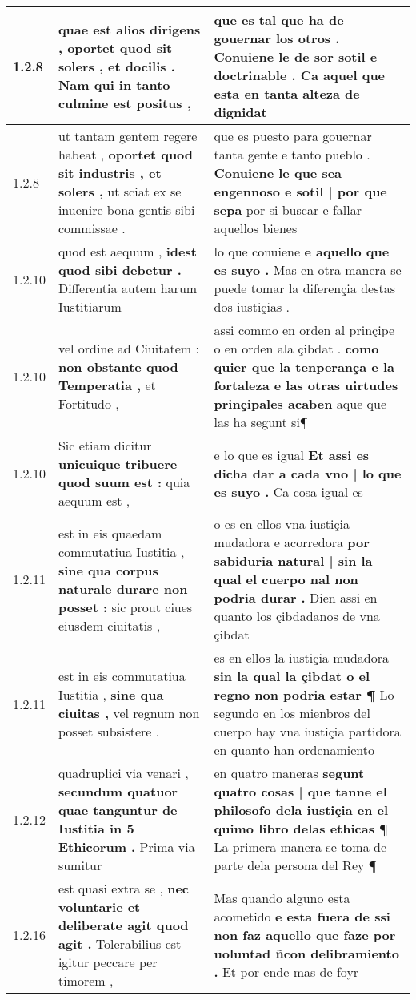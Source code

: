 \begin{tabular}{|p{1cm}|p{6.5cm}|p{6.5cm}|}
1.2.8 & quae est alios dirigens , \textbf{ oportet quod sit solers , et docilis . } Nam qui in tanto culmine est positus , & que es tal que ha de gouernar los otros . \textbf{ Conuiene le de sor sotil e doctrinable . } Ca aquel que esta en tanta alteza de dignidat \\\hline
1.2.8 & ut tantam gentem regere habeat , \textbf{ oportet quod sit industris , et solers , } ut sciat ex se inuenire bona gentis sibi commissae . & que es puesto para gouernar tanta gente e tanto pueblo . \textbf{ Conuiene le que sea engennoso e sotil | por que sepa } por si buscar e fallar aquellos bienes \\\hline
1.2.10 & quod est aequum , \textbf{ idest quod sibi debetur . } Differentia autem harum Iustitiarum & lo que conuiene \textbf{ e aquello que es suyo . } Mas en otra manera se puede tomar la diferençia destas dos iustiçias . \\\hline
1.2.10 & vel ordine ad Ciuitatem : \textbf{ non obstante quod Temperatia , } et Fortitudo , & assi commo en orden al prinçipe o en orden ala çibdat . \textbf{ como quier que la tenperança e la fortaleza e las otras uirtudes prinçipales acaben } aque que las ha segunt si¶ \\\hline
1.2.10 & Sic etiam dicitur \textbf{ unicuique tribuere quod suum est : } quia aequum est , & e lo que es igual \textbf{ Et assi es dicha dar a cada vno | lo que es suyo . } Ca cosa igual es \\\hline
1.2.11 & est in eis quaedam commutatiua Iustitia , \textbf{ sine qua corpus naturale durare non posset : } sic prout ciues eiusdem ciuitatis , & o es en ellos vna iustiçia mudadora e acorredora \textbf{ por sabiduria natural | sin la qual el cuerpo nal non podria durar . } Dien assi en quanto los çibdadanos de vna çibdat \\\hline
1.2.11 & est in eis commutatiua Iustitia , \textbf{ sine qua ciuitas , } vel regnum non posset subsistere . & es en ellos la iustiçia mudadora \textbf{ sin la qual la çibdat o el regno non podria estar ¶ } Lo segundo en los mienbros del cuerpo hay vna iustiçia partidora en quanto han ordenamiento \\\hline
1.2.12 & quadruplici via venari , \textbf{ secundum quatuor quae tanguntur de Iustitia in 5 Ethicorum . } Prima via sumitur & en quatro maneras \textbf{ segunt quatro cosas | que tanne el philosofo dela iustiçia en el quimo libro delas ethicas ¶ } La primera manera se toma de parte dela persona del Rey ¶ \\\hline
1.2.16 & est quasi extra se , \textbf{ nec voluntarie et deliberate agit quod agit . } Tolerabilius est igitur peccare per timorem , & Mas quando alguno esta acometido \textbf{ e esta fuera de ssi non faz aquello que faze por uoluntad ñcon delibramiento . } Et por ende mas de foyr \\\hline

\end{tabular}
